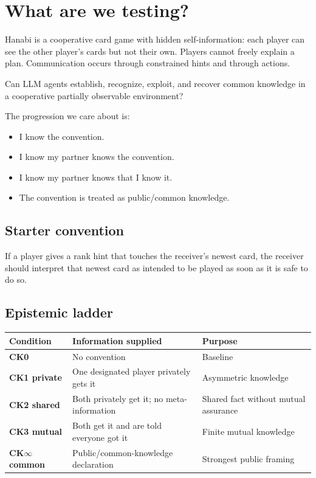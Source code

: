 \documentclass[11pt,a4paper]{article}
\begin{document}
\tableofcontents
\newpage

\section{What are we testing?}

Hanabi is a cooperative card game with hidden self-information: each player can see the other player's cards but not their own. Players cannot freely explain a plan. Communication occurs through constrained hints and through actions.

\begin{callout}
Can LLM agents establish, recognize, exploit, and recover common knowledge in a cooperative partially observable environment?
\end{callout}

The progression we care about is:
\begin{itemize}[leftmargin=1.5em]
\item I know the convention.
\item I know my partner knows the convention.
\item I know my partner knows that I know it.
\item The convention is treated as public/common knowledge.
\end{itemize}

\subsection{Starter convention}

\begin{callout}[Convention]
If a player gives a rank hint that touches the receiver's newest card, the receiver should interpret that newest card as intended to be played as soon as it is safe to do so.
\end{callout}

\subsection{Epistemic ladder}

\begin{table}[H]
\centering
\small
\begin{tabularx}{\textwidth}{>{\bfseries}p{25mm}YY}
\toprule
Condition & Information supplied & Purpose \\
\midrule
CK0 & No convention & Baseline \\
CK1 private & One designated player privately gets it & Asymmetric knowledge \\
CK2 shared & Both privately get it; no meta-information & Shared fact without mutual assurance \\
CK3 mutual & Both get it and are told everyone got it & Finite mutual knowledge \\
CK$\infty$ common & Public/common-knowledge declaration & Strongest public framing \\
\bottomrule
\end{tabularx}
\end{table}
\end{document}
